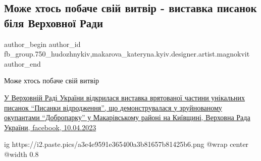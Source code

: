  
 
 
 
 

\subsection{Може хтось побаче свій витвір - виставка писанок біля Верховної Ради}
\label{sec:12_04_2023.fb.fb_group.750_hudozhnykiv.1.mozhe_htos_pobachyt_svij_vytriv_verhovna_rada}
 
\ifcmt
 author_begin
   author_id fb_group.750_hudozhnykiv,makarova_kateryna.kyiv.designer.artist.magnokvit
 author_end
\fi

Може хтось побаче свій витвір 💛💙

\href{https://www.facebook.com/verkhovna.rada.ukraine/posts/pfbid02XGUNKCieKZq9S3J62V9f4eVgjjUqXnQfFd8upSwhCvCE7CgCN4S7wdf5fLewewD8l}{%
У Верховній Раді України відкрилася виставка врятованої частини унікальних
писанок \enquote{Писанки відродження}, що демонструвалася у зруйнованому окупантами
\enquote{Добропарку} у Макарівському районі на Київщині, Верховна Рада України, facebook, 10.04.2023%
}

\ifcmt
  ig https://i2.paste.pics/a3e4e9591e365400a3b81657b81425b6.png
  @wrap center
  @width 0.8
\fi

